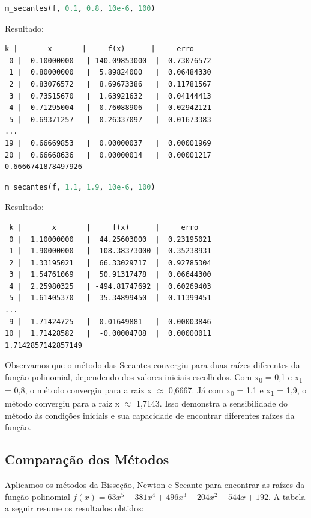 \documentclass{article}
\begin{document}
\begin{lstlisting}[language=Python]
m_secantes(f, 0.1, 0.8, 10e-6, 100)
\end{lstlisting}

Resultado:
\begin{verbatim}
k |       x       |     f(x)      |     erro      
 0 |  0.10000000   | 140.09853000  |  0.73076572   
 1 |  0.80000000   |  5.89824000   |  0.06484330   
 2 |  0.83076572   |  8.69673386   |  0.11781567   
 3 |  0.73515670   |  1.63921632   |  0.04144413   
 4 |  0.71295004   |  0.76088906   |  0.02942121   
 5 |  0.69371257   |  0.26337097   |  0.01673383   
...
19 |  0.66669853   |  0.00000037   |  0.00001969   
20 |  0.66668636   |  0.00000014   |  0.00001217   
0.6666741878497926
\end{verbatim}

\begin{lstlisting}[language=Python]
m_secantes(f, 1.1, 1.9, 10e-6, 100)
\end{lstlisting}

Resultado:
\begin{verbatim}
 k |       x       |     f(x)      |     erro      
 0 |  1.10000000   |  44.25603000  |  0.23195021   
 1 |  1.90000000   | -108.38373000 |  0.35238931   
 2 |  1.33195021   |  66.33029717  |  0.92785304   
 3 |  1.54761069   |  50.91317478  |  0.06644300   
 4 |  2.25980325   | -494.81747692 |  0.60269403   
 5 |  1.61405370   |  35.34899450  |  0.11399451   
...
 9 |  1.71424725   |  0.01649881   |  0.00003846   
10 |  1.71428582   |  -0.00004708  |  0.00000011   
1.7142857142857149
\end{verbatim}

Observamos que o método das Secantes convergiu para duas raízes diferentes da função polinomial, dependendo dos valores iniciais escolhidos. Com x\textsubscript{0} = 0,1 e x\textsubscript{1} = 0,8, o método convergiu para a raiz x $\approx$ 0,6667. Já com x\textsubscript{0} = 1,1 e x\textsubscript{1} = 1,9, o método convergiu para a raiz x $\approx$ 1,7143. Isso demonstra a sensibilidade do método às condições iniciais e sua capacidade de encontrar diferentes raízes da função.


\subsection{Compara\c{c}\~{a}o dos M\'{e}todos}
Aplicamos os m\'{e}todos da Bisse\c{c}\~{a}o, Newton e Secante para encontrar as ra\'{i}zes da fun\c{c}\~{a}o polinomial $f(x) = 63x^5 - 381x^4 + 496x^3 + 204x^2 - 544x + 192$. A tabela a seguir resume os resultados obtidos:
\end{document}
